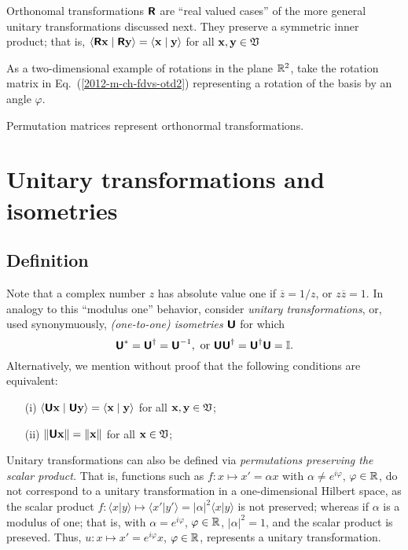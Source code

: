 Orthonomal transformations $\textsf{\textbf{R}}$ are ``real valued cases'' of the more general unitary transformations discussed next.
They preserve a symmetric inner product; that is,
$\langle \textsf{\textbf{R}}{\bf x}\mid \textsf{\textbf{R}}{\bf y} \rangle
=
\langle {\bf x}\mid {\bf y} \rangle$ for all ${\bf x} ,{\bf y} \in {\frak V}$


{\color{blue}
\bexample
As a  two-dimensional  example of rotations in the plane ${\Bbb R}^2$,
take the rotation matrix in Eq.~(\ref{2012-m-ch-fdvs-otd2})
representing a rotation of the basis by an angle $\varphi$.

Permutation matrices represent orthonormal transformations.
\eexample
}

\section{Unitary transformations and isometries}
\label{2014-m-ch-fdvs-unitary}

\subsection {Definition}
Note that a complex number $z$ has absolute value one if $\overline{z}=1/z$, or $z\overline{z}=1$.
In analogy to this ``modulus one'' behavior,
consider {\em unitary transformations}, or, used synonymuously, {\em (one-to-one) isometries}
$\textsf{\textbf{U}}$ for which
\begin{equation}
\textsf{\textbf{U}}^*= \textsf{\textbf{U}}^\dagger =\textsf{\textbf{U}}^{-1},
\textrm{ or } \textsf{\textbf{U}}\textsf{\textbf{U}}^\dagger =\textsf{\textbf{U}}^\dagger \textsf{\textbf{U}}={\Bbb I}.
\end{equation}
Alternatively, we mention without proof that the following conditions are equivalent:
\begin{itemize}
\item[(i)]
$\langle \textsf{\textbf{U}}{\bf x}\mid \textsf{\textbf{U}}{\bf y} \rangle
=
\langle {\bf x}\mid {\bf y} \rangle$ for all ${\bf x} ,{\bf y} \in {\frak V}$;
\item[(ii)]
$\| \textsf{\textbf{U}}{\bf x}\|
=
\|{\bf x}\|$ for all ${\bf x}  \in {\frak V}$;
\end{itemize}

Unitary transformations can also be defined via {\em permutations preserving the scalar product.}
That is, functions such as
$f: x \mapsto x' =\alpha x$ with $\alpha \neq e^{i\varphi}$, $\varphi \in {\Bbb R}$,
do not correspond to a  unitary transformation in a one-dimensional Hilbert space, as
the scalar product $f:
\langle x \vert y \rangle
\mapsto
\langle x'\vert y'\rangle = \vert \alpha \vert^2 \langle x\vert y\rangle$
is not preserved; whereas if $\alpha$ is a modulus of one; that is,
with $\alpha = e^{i\varphi}$, $\varphi \in {\Bbb R}$,
$\vert \alpha \vert^2=1$, and the scalar product is preseved.
Thus, $u: x \mapsto x' =e^{i\varphi} x$, $\varphi \in {\Bbb R}$,
represents a unitary transformation.

